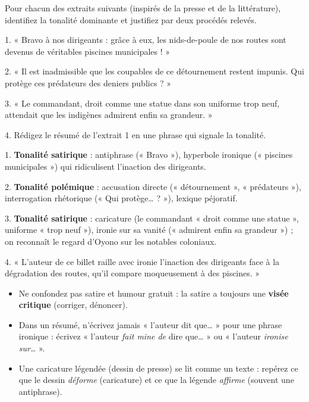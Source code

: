 \documentclass[11pt]{article}
\newcommand{\cle}[1]{{\popxbold\color{popdark}#1}}
\begin{document}
\begin{exercice}
Pour chacun des extraits suivants (inspirés de la presse et de la littérature), identifiez la tonalité dominante et justifiez par deux procédés relevés.

1. « Bravo à nos dirigeants : grâce à eux, les nids-de-poule de nos routes sont devenus de véritables piscines municipales ! »

2. « Il est inadmissible que les coupables de ce détournement restent impunis. Qui protège ces prédateurs des deniers publics ? »

3. « Le commandant, droit comme une statue dans son uniforme trop neuf, attendait que les indigènes admirent enfin sa grandeur. »

4. Rédigez le résumé de l'extrait 1 en une phrase qui signale la tonalité.
\end{exercice}

\begin{corrige}
1. \textbf{Tonalité satirique} : antiphrase (« Bravo »), hyperbole ironique (« piscines municipales ») qui ridiculisent l'inaction des dirigeants.

2. \textbf{Tonalité polémique} : accusation directe (« détournement », « prédateurs »), interrogation rhétorique (« Qui protège… ? »), lexique péjoratif.

3. \textbf{Tonalité satirique} : caricature (le commandant « droit comme une statue », uniforme « trop neuf »), ironie sur sa vanité (« admirent enfin sa grandeur ») ; on reconnaît le regard d'Oyono sur les notables coloniaux.

4. « L'auteur de ce billet raille avec ironie l'inaction des dirigeants face à la dégradation des routes, qu'il compare moqueusement à des piscines. »
\end{corrige}

\begin{attention}
\begin{itemize}
\item Ne confondez pas \cle{satire} et \cle{humour} gratuit : la satire a toujours une \textbf{visée critique} (corriger, dénoncer).
\item Dans un résumé, n'écrivez jamais « l'auteur dit que… » pour une phrase ironique : écrivez « l'auteur \emph{fait mine de} dire que… » ou « l'auteur \emph{ironise sur}… ».
\item Une caricature légendée (dessin de presse) se lit comme un texte : repérez ce que le dessin \emph{déforme} (caricature) et ce que la légende \emph{affirme} (souvent une antiphrase).
\end{itemize}
\end{attention}
\end{document}
